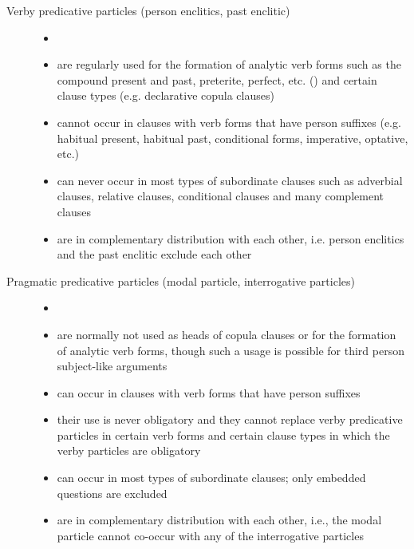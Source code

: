 \begin{description}
\item[Verby predicative particles (person enclitics, past enclitic)]
\begin{itemize}[leftmargin=*]
    \item[]
	\item	are regularly used for the formation of analytic verb forms such as the compound present and past, preterite, perfect, etc. () and certain clause types (e.g. declarative copula clauses)
	\item	cannot occur in clauses with verb forms that have person suffixes (e.g. habitual present, habitual past, conditional forms, imperative, optative, etc.)
	\item	can never occur in most types of subordinate clauses such as adverbial clauses, relative clauses, conditional clauses and many complement clauses
	\item	are in complementary distribution with each other, i.e. person enclitics and the past enclitic exclude each other
\end{itemize}

\item[Pragmatic predicative particles (modal particle, interrogative particles)]
%
\begin{itemize}[leftmargin=*]
    \item[]
	\item	are normally not used as heads of copula clauses or for the formation of analytic verb forms, though such a usage is possible for third person subject-like arguments
	\item	can occur in clauses with verb forms that have person suffixes
	\item their use is never obligatory	and they cannot replace verby predicative particles in certain verb forms and certain clause types in which the verby particles are obligatory
	\item can occur in most types of subordinate clauses; only embedded questions are excluded
	\item	are in complementary distribution with each other, i.e., the modal particle cannot co-occur with any of the interrogative particles
\end{itemize}
\end{description}

